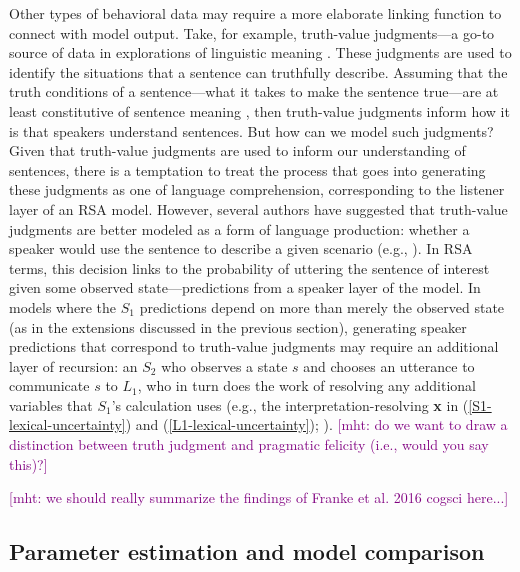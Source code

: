 \documentclass{sp}
\newcommand{\gcs}[1]{\textcolor{blue}{[gcs: #1]}}
\newcommand{\mht}[1]{\textcolor{purple}{[mht: #1]}}
\begin{document}
Other types of behavioral data may require a more elaborate linking function to connect with model output. Take, for example, truth-value judgments---a go-to source of data in explorations of linguistic meaning \citep{crainmckee1985,crainthornton1998}. These judgments are used to identify the situations that a sentence can truthfully describe. Assuming that the truth conditions of a sentence---what it takes to make the sentence true---are at least constitutive of sentence meaning \citep[e.g.,][]{chierchiamcconnellginet2000}, then truth-value judgments inform how it is that speakers understand sentences. But how can we model such judgments? Given that truth-value judgments are used to inform our understanding of sentences, there is a temptation to treat the process that goes into generating these judgments as one of language comprehension, corresponding to the listener layer of an RSA model. However, several authors have suggested that truth-value judgments are better modeled as a form of language production: whether a speaker would use the sentence to describe a given scenario (e.g., \citealp{degengoodman2014,savinellietal2017,tesslergoodman2019, jasbietal2019}). In RSA terms, this decision links to the probability of uttering the sentence of interest given some observed state---predictions from a speaker layer of the model. In models where the $S_1$ predictions depend on more than merely the observed state (as in the extensions discussed in the previous section), generating speaker predictions that correspond to truth-value judgments may require an additional layer of recursion: an $S_2$ who observes a state $s$ and chooses an utterance to communicate $s$ to $L_1$, who in turn does the work of resolving any additional variables that $S_1$'s calculation uses (e.g., the interpretation-resolving \textbf{x} in (\ref{S1-lexical-uncertainty}) and (\ref{L1-lexical-uncertainty}); \citealp{savinellietal2017}).
\mht{do we want to draw a distinction between truth judgment and pragmatic felicity (i.e., would you say this)?}


\mht{we should really summarize the findings of Franke et al. 2016 cogsci here...}

\subsection{Parameter estimation and model comparison}
\end{document}
